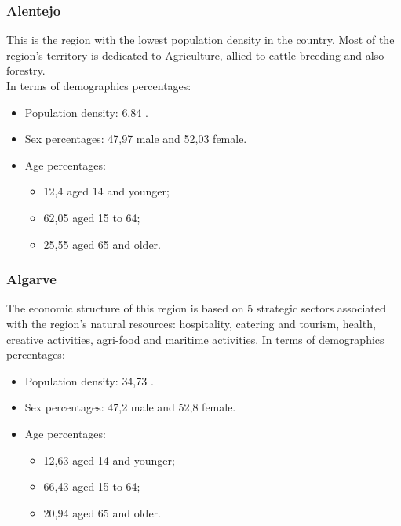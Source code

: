 \subsubsection{Alentejo}
This is the region with the lowest population density in the country. Most of the region's territory is dedicated to Agriculture, allied to cattle breeding and also forestry.\\
In terms of demographics percentages:

    \begin{itemize}
        \item Population density: {6,84\textdiscount} . 
        \item Sex percentages: {47,97\textdiscount} male and {52,03\textdiscount} female.
        \item Age percentages: 
        \begin{itemize}
        \item {12,4 \textdiscount} aged 14 and younger;
        \item {62,05\textdiscount} aged 15 to 64;
        \item {25,55\textdiscount} aged 65 and older.
        \end{itemize}
    \end{itemize}
    
\subsubsection{Algarve}
The economic structure of this region is based on 5 strategic sectors associated with the region's natural resources: hospitality, catering and tourism, health, creative activities, agri-food and maritime activities. 
In terms of demographics percentages:
    \begin{itemize}
        \item Population density: {34,73\textdiscount} . 
        \item Sex percentages: {47,2\textdiscount} male and {52,8\textdiscount} female.
        \item Age percentages: 
        \begin{itemize}
        \item {12,63 \textdiscount} aged 14 and younger;
        \item {66,43\textdiscount} aged 15 to 64;
        \item {20,94\textdiscount} aged 65 and older.
        \end{itemize}
    \end{itemize}
    
